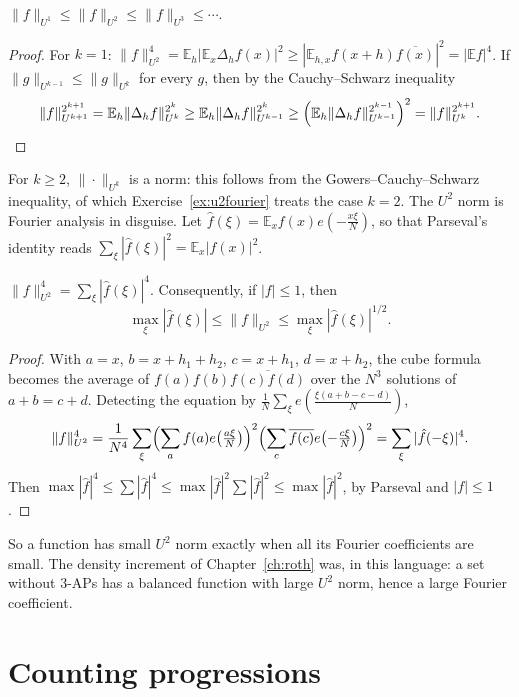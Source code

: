 \begin{lemma}\label{lem:monotone}
$\|f\|_{U^1}\le\|f\|_{U^2}\le\|f\|_{U^3}\le\cdots$.
\end{lemma}
\begin{proof}
For $k=1$: $\|f\|_{U^2}^4=\mathbb E_h|\mathbb E_x\Delta_hf(x)|^2\ge|\mathbb E_{h,x}f(x+h)\overline{f(x)}|^2=|\mathbb E f|^4$. If $\|g\|_{U^{k-1}}\le\|g\|_{U^k}$ for every $g$, then by the Cauchy--Schwarz inequality
\[
\|f\|_{U^{k+1}}^{2^{k+1}}=\mathbb E_h\|\Delta_hf\|_{U^k}^{2^k}\ge\mathbb E_h\|\Delta_hf\|_{U^{k-1}}^{2^k}\ge\Bigl(\mathbb E_h\|\Delta_hf\|_{U^{k-1}}^{2^{k-1}}\Bigr)^2=\|f\|_{U^k}^{2^{k+1}}.
\]
\end{proof}

For $k\ge2$, $\|\cdot\|_{U^k}$ is a norm: this follows from the Gowers--Cauchy--Schwarz inequality, of which Exercise~\ref{ex:u2fourier} treats the case $k=2$. The $U^2$ norm is Fourier analysis in disguise. Let $\hat f(\xi)=\mathbb E_xf(x)e(-\frac{x\xi}N)$, so that Parseval's identity reads $\sum_\xi|\hat f(\xi)|^2=\mathbb E_x|f(x)|^2$.

\begin{lemma}\label{lem:u2}
$\|f\|_{U^2}^4=\sum_\xi|\hat f(\xi)|^4$. Consequently, if $|f|\le1$, then
\[
\max_\xi|\hat f(\xi)|\le\|f\|_{U^2}\le\max_\xi|\hat f(\xi)|^{1/2}.
\]
\end{lemma}
\begin{proof}
With $a=x$, $b=x+h_1+h_2$, $c=x+h_1$, $d=x+h_2$, the cube formula becomes the average of $f(a)f(b)\overline{f(c)f(d)}$ over the $N^3$ solutions of $a+b=c+d$. Detecting the equation by $\frac1N\sum_\xi e(\frac{\xi(a+b-c-d)}N)$,
\[
\|f\|_{U^2}^4=\frac1{N^4}\sum_\xi\Bigl(\sum_af(a)e\bigl(\tfrac{a\xi}N\bigr)\Bigr)^2\Bigl(\sum_c\overline{f(c)}e\bigl(-\tfrac{c\xi}N\bigr)\Bigr)^2=\sum_\xi|\hat f(-\xi)|^4.
\]
Then $\max|\hat f|^4\le\sum|\hat f|^4\le\max|\hat f|^2\sum|\hat f|^2\le\max|\hat f|^2$, by Parseval and $|f|\le1$.
\end{proof}

So a function has small $U^2$ norm exactly when all its Fourier coefficients are small. The density increment of Chapter~\ref{ch:roth} was, in this language: a set without $3$-APs has a balanced function with large $U^2$ norm, hence a large Fourier coefficient.

\section{Counting progressions}

